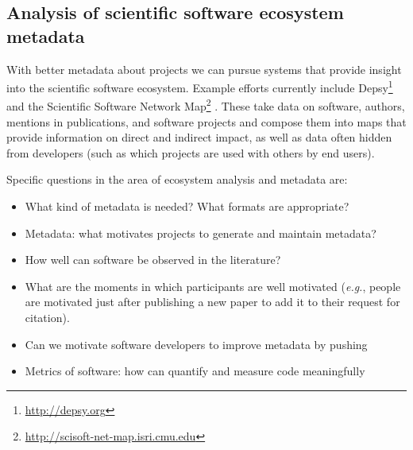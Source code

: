 \documentclass[a4paper,UKenglish]{dagman}
\newcommand{\eg}{\emph{e.g.},\xspace}
\begin{document}
\subsection{Analysis of scientific software ecosystem metadata}

With better metadata about projects we can pursue systems that provide insight into the scientific software ecosystem.
Example efforts currently include Depsy\footnote{\url{http://depsy.org}}   and the Scientific Software Network Map\footnote{\url{http://scisoft-net-map.isri.cmu.edu}}  .
These take data on software, authors, mentions in publications, and software projects and compose them into maps that provide information on direct and indirect impact, as well as data often hidden from developers (such as which projects are used with others by end users).

Specific questions in the area of ecosystem analysis and metadata are:

\begin{itemize}
\item What kind of metadata is needed? What formats are appropriate?
\item Metadata: what motivates projects to generate and maintain metadata?
\item How well can software be observed in the literature?
\item What are the moments in which participants are well motivated (\eg people are motivated just after publishing a new paper to add it to their request for citation).
\item Can we motivate software developers to improve metadata by pushing 
\item Metrics of software: how can quantify and measure code meaningfully
\end{itemize}
\end{document}
